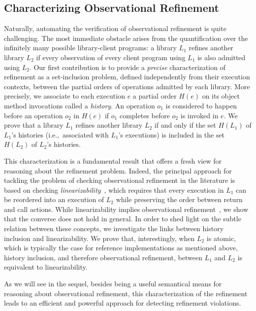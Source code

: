 \subsection{Characterizing Observational Refinement}
\label{sec:intro:histories}

Naturally, automating the verification of observational refinement is quite
challenging. The most immediate obstacle arises from the quantification over
the infinitely many possible library-client programs: a library $L_1$ refines
another library $L_2$ if every observation of every client program using $L_1$
is also admitted using $L_2$. Our first contribution is to provide a
\emph{precise} characterization of refinement as a set-inclusion problem,
defined independently from their execution contexts, between the partial orders
of operations admitted by each library. More precisely, we associate to each
execution $e$ a partial order $H(e)$ on its object method invocations called a
\emph{history}. An operation $o_1$ is considered to happen before an operation
$o_2$ in $H(e)$ if $o_1$ completes before $o_2$ is invoked in $e$. We prove
that a library $L_1$ refines another library $L_2$ if and only if the set
$H(L_1)$ of $L_1$'s histories (i.e.,~associated with $L_1$'s executions) is
included in the set $H(L_2)$ of $L_2$'s histories.

This characterization is a fundamental result that offers a fresh view for
reasoning about the refinement problem. Indeed, the principal approach for
tackling the problem of checking observational refinement in the literature is
based on checking \emph{linearizability}~\cite{journals/toplas/HerlihyW90},
which requires that every execution in $L_1$ can be reordered into an execution
of $L_2$ while preserving the order between return and call actions. While
linearizability implies observational
refinement~\cite{journals/tcs/FilipovicORY10}, we show that the converse does
not hold in general. In order to shed light on the subtle relation between
these concepts, we investigate the links between history inclusion and
linearizability. We prove that, interestingly, when $L_2$ is atomic, which is
typically the case for reference implementations as mentioned above, history
inclusion, and therefore observational refinement, between $L_1$ and $L_2$ is
equivalent to linearizability.

As we will see in the sequel, besides being a useful semantical means for
reasoning about observational refinement, this characterization of the
refinement leads to an efficient and powerful approach for detecting refinement
violations.


